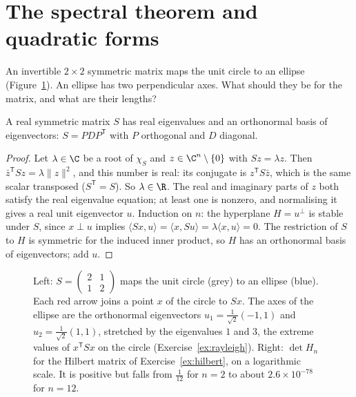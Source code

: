 \section{The spectral theorem and quadratic forms}
\begin{think}
An invertible $2\times2$ symmetric matrix maps the unit circle to an ellipse (Figure~\ref{fig:ellipse}). An ellipse has two perpendicular axes. What should they be for the matrix, and what are their lengths?
\end{think}

\begin{theorem}\label{thm:spectral}
A real symmetric matrix $S$ has real eigenvalues and an orthonormal basis of eigenvectors: $S=PDP^{\mathsf T}$ with $P$ orthogonal and $D$ diagonal.
\end{theorem}
\begin{proof}
Let $\lambda\in\C$ be a root of $\chi_S$ and $z\in\C^n\setminus\{0\}$ with $Sz=\lambda z$. Then $\bar z^{\mathsf T}Sz=\lambda\|z\|^2$, and this number is real: its conjugate is $z^{\mathsf T}S\bar z$, which is the same scalar transposed ($S^{\mathsf T}=S$). So $\lambda\in\R$. The real and imaginary parts of $z$ both satisfy the real eigenvalue equation; at least one is nonzero, and normalising it gives a real unit eigenvector $u$.
Induction on $n$: the hyperplane $H=u^\perp$ is stable under $S$, since $x\perp u$ implies $\langle Sx,u\rangle=\langle x,Su\rangle=\lambda\langle x,u\rangle=0$. The restriction of $S$ to $H$ is symmetric for the induced inner product, so $H$ has an orthonormal basis of eigenvectors; add $u$.
\end{proof}

\begin{figure}[ht]
\centering
{}
\caption{Left: $S=\begin{pmatrix}2&1\\1&2\end{pmatrix}$ maps the unit circle (grey) to an ellipse (blue). Each red arrow joins a point $x$ of the circle to $Sx$. The axes of the ellipse are the orthonormal eigenvectors $u_1=\frac1{\sqrt2}(-1,1)$ and $u_2=\frac1{\sqrt2}(1,1)$, stretched by the eigenvalues $1$ and $3$, the extreme values of $x^{\mathsf T}Sx$ on the circle (Exercise~\ref{ex:rayleigh}). Right: $\det H_n$ for the Hilbert matrix of Exercise~\ref{ex:hilbert}, on a logarithmic scale. It is positive but falls from $\frac1{12}$ for $n=2$ to about $2.6\times10^{-78}$ for $n=12$.}
\label{fig:ellipse}
\end{figure}

